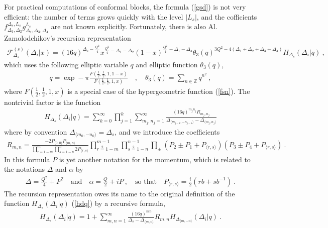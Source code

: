 \documentclass[12pt,a4paper,notitlepage]{report}
\newcommand \Z {\mathbb{Z}}
\numberwithin{equation}{section}
\theoremstyle{break}
\begin{document}
For practical computations of conformal blocks, the formula (\ref{gsd}) is not very efficient: the number of terms grows quickly with the level $|L_s|$, and the cofficients $f_{\Delta_1,\Delta_2}^{\Delta_s,L_s} g^{L_s}_{\Delta_s,\Delta_3,\Delta_4}$ are not known explicitly.
Fortunately, there is also Al. Zamolodchikov's recursion representation \cite{zz90}
\begin{align}
 \mathcal{F}^{(s)}_{\Delta_s}(\Delta_i|x) 
=  (16q)^{\Delta_s -\frac{Q^2}{4}} x^{\frac{Q^2}{4}-\Delta_1-\Delta_2} (1-x)^{\frac{Q^2}{4}-\Delta_1-\Delta_4} \theta_3(q)^{3Q^2-4(\Delta_1+\Delta_2+\Delta_3+\Delta_4)} H_{\Delta_s}(\Delta_i|q)\ ,
\end{align}
which uses the following elliptic variable $q$ and elliptic function $\theta_3(q)$,
\begin{align}
 q = \exp -\pi \frac{F(\frac12,\frac12,1,1-x)}{F(\frac12,\frac12,1,x)}  \quad , \quad \theta_3(q) = \sum_{n\in\Z} q^{n^2}\ ,
\end{align}
where $F(\frac12,\frac12,1,x)$ is a special case of the hypergeometric function (\ref{fsn}). The nontrivial factor is the function
\begin{align}
 H_{\Delta_s}(\Delta_i|q) = \sum_{k=0}^\infty \prod_{j=1}^k \sum_{m_j,n_j=1}^\infty \frac{(16q)^{m_jn_j}R_{m_j,n_j}}{\Delta_{\langle m_{j-1},-n_{j-1} \rangle}-\Delta_{\langle m_j,n_j\rangle}}
\label{hdq}
\end{align}
where by convention $\Delta_{\langle m_0,-n_0\rangle} = \Delta_s$, and we introduce the coefficients
\begin{align}
 R_{m,n} = \frac{-2P_{\langle 0,0\rangle} P_{\langle m,n\rangle}}{\prod_{r=1-m}^m \prod_{s=1-n}^n 2P_{\langle r,s\rangle}}
\prod_{r\overset{2}{=}1-m}^{m-1} \prod_{s\overset{2}{=}1-n}^{n-1} \prod_\pm (P_2\pm P_1 + P_{\langle r,s\rangle}) (P_3\pm P_4 +P_{\langle r,s\rangle})\ .
\end{align}
In this formula $P$ is yet another notation for the momentum, which is related to the notations $\Delta$ and $\alpha$ by
\begin{align}
 \Delta = \frac{Q^2}{4} + P^2 \quad \text{and} \quad \alpha = \frac{Q}{2}+iP\ , \quad \text{so that} \quad P_{\langle r,s\rangle} = \frac{i}{2}\left(rb+sb^{-1}\right)\ .
\end{align}
The recursion representation owes its name to the original definition of the function $H_{\Delta_s}(\Delta_i|q)$ (\ref{hdq}) by a recursive formula,
\begin{align}
 H_{\Delta_s}(\Delta_i|q) = 1 + \sum_{m,n=1}^\infty \frac{(16q)^{mn}}{\Delta_s-\Delta_{\langle m,n\rangle}} R_{m,n} H_{\Delta_{\langle m,-n\rangle}}(\Delta_i|q)\ .
\end{align}
\end{document}
